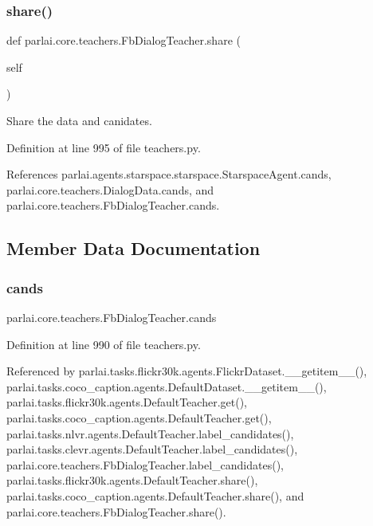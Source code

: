 \subsubsection{\texorpdfstring{share()}{share()}}
{\footnotesize\ttfamily def parlai.\+core.\+teachers.\+Fb\+Dialog\+Teacher.\+share (\begin{DoxyParamCaption}\item[{}]{self }\end{DoxyParamCaption})}

\begin{DoxyVerb}Share the data and canidates.\end{DoxyVerb}
 

Definition at line 995 of file teachers.\+py.



References parlai.\+agents.\+starspace.\+starspace.\+Starspace\+Agent.\+cands, parlai.\+core.\+teachers.\+Dialog\+Data.\+cands, and parlai.\+core.\+teachers.\+Fb\+Dialog\+Teacher.\+cands.



\subsection{Member Data Documentation}
\mbox{\label{classparlai_1_1core_1_1teachers_1_1FbDialogTeacher_a3ec67545250d8a877038667e3f4ea158}} 
\subsubsection{\texorpdfstring{cands}{cands}}
{\footnotesize\ttfamily parlai.\+core.\+teachers.\+Fb\+Dialog\+Teacher.\+cands}



Definition at line 990 of file teachers.\+py.



Referenced by parlai.\+tasks.\+flickr30k.\+agents.\+Flickr\+Dataset.\+\_\+\+\_\+getitem\+\_\+\+\_\+(), parlai.\+tasks.\+coco\+\_\+caption.\+agents.\+Default\+Dataset.\+\_\+\+\_\+getitem\+\_\+\+\_\+(), parlai.\+tasks.\+flickr30k.\+agents.\+Default\+Teacher.\+get(), parlai.\+tasks.\+coco\+\_\+caption.\+agents.\+Default\+Teacher.\+get(), parlai.\+tasks.\+nlvr.\+agents.\+Default\+Teacher.\+label\+\_\+candidates(), parlai.\+tasks.\+clevr.\+agents.\+Default\+Teacher.\+label\+\_\+candidates(), parlai.\+core.\+teachers.\+Fb\+Dialog\+Teacher.\+label\+\_\+candidates(), parlai.\+tasks.\+flickr30k.\+agents.\+Default\+Teacher.\+share(), parlai.\+tasks.\+coco\+\_\+caption.\+agents.\+Default\+Teacher.\+share(), and parlai.\+core.\+teachers.\+Fb\+Dialog\+Teacher.\+share().

